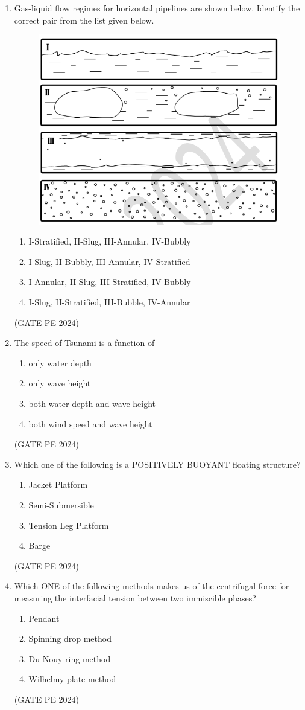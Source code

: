 \documentclass[journal,12pt,onecolumn]{IEEEtran}
\theoremstyle{remark}
\begin{document}
\begin{enumerate}
\item Gas-liquid flow regimes for horizontal pipelines are shown below. Identify the correct pair from the list given below.
\begin{figure}[H]
    \centering
    \includegraphics[width=0.5\columnwidth]{Q_17.png}
    \caption{}
    \label{fig:placeholder}
\end{figure}
\begin{enumerate}
    \item I-Stratified, II-Slug, III-Annular, IV-Bubbly
    \item I-Slug, II-Bubbly, III-Annular, IV-Stratified
    \item I-Annular, II-Slug, III-Stratified, IV-Bubbly
    \item I-Slug, II-Stratified, III-Bubble, IV-Annular
\end{enumerate}
\hfill{(GATE PE 2024)}

\item The speed of Tsunami is a function of
\begin{enumerate}
    \item only water depth
    \item only wave height
    \item both water depth and wave height
    \item both wind speed and wave height
\end{enumerate}
\hfill{(GATE PE 2024)}

\item Which one of the following is a POSITIVELY BUOYANT floating structure?
\begin{enumerate}
    \item Jacket Platform
    \item Semi-Submersible
    \item Tension Leg Platform
    \item Barge
\end{enumerate}
\hfill{(GATE PE 2024)}

\item Which ONE of the following methods makes us of the centrifugal force for measuring the interfacial tension between two immiscible phases?
\begin{enumerate}
    \item Pendant
    \item Spinning drop method
    \item Du Nouy ring method
    \item Wilhelmy plate method
\end{enumerate}
\hfill{(GATE PE 2024)}


\end{enumerate}
\end{document}
